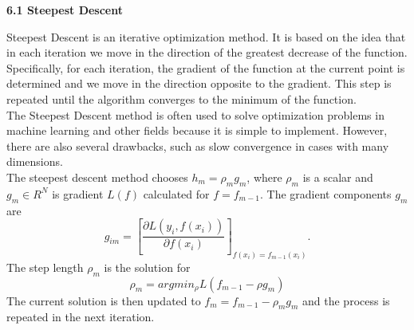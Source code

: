 \documentclass[12pt, letterpaper, twoside]{article}
\begin{document}
\begin{center}
\textbf{\large{6.1  Steepest Descent}} 
\end{center}
\hspace*{4ex} Steepest Descent is an iterative optimization method. It is based on the idea that in each iteration we move in the direction of the greatest decrease of the function.\\
\hspace*{4ex} Specifically, for each iteration, the gradient of the function at the current point is determined and we move in the direction opposite to the gradient. This step is repeated until the algorithm converges to the minimum of the function.\\
\hspace*{4ex}The Steepest Descent method is often used to solve optimization problems in machine learning and other fields because it is simple to implement. However, there are also several drawbacks, such as slow convergence in cases with many dimensions.\\
The steepest descent method chooses $h_m=\rho_mg_m$, where $\rho_m$ is a scalar and $g_m \in R^N$ is gradient $L(f)$ calculated for $f=f_{m-1}$. The gradient components $g_m$ are
\begin{equation*}
g_{im}=[\frac{\partial L(y_i,f(x_i))}{\partial f(x_i)}]_{f(x_i)=f_{m-1}(x_i)}.
\end{equation*}
The step length $\rho_m$ is the solution for
\begin{equation*}
\rho_m=argmin_{\rho}L(f_{m-1}-\rho g_m)
\end{equation*}
The current solution is then updated to $f_m = f_{m−1}− \rho_m g_m$ and the process is repeated in the next iteration.
\pagebreak
\end{document}
